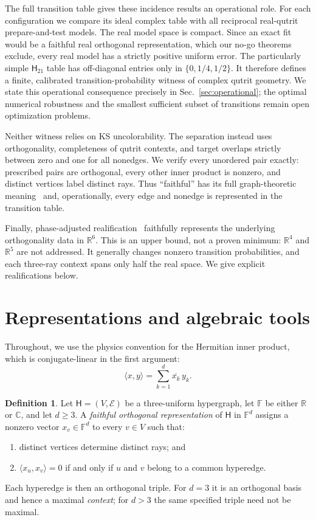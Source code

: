 \documentclass[twocolumn,aps,pra,floatfix,amsmath,amssymb,longbibliography]{revtex4-2}
\theoremstyle{definition}
\newtheorem{definition}[theorem]{Definition}
\theoremstyle{remark}
\newcommand{\C}{\mathbb C}
\newcommand{\R}{\mathbb R}
\newcommand{\Htwentyone}{\mathsf H_{21}}
\begin{document}
The full transition table gives these incidence results an operational role.
For each configuration we compare its ideal complex table with all reciprocal
real-qutrit prepare-and-test models.  The real model space is compact.  Since
an exact fit would be a faithful real orthogonal representation, which our
no-go theorems exclude, every real model has a strictly positive uniform
error.  The particularly simple $\Htwentyone$ table has off-diagonal entries
only in $\{0,1/4,1/2\}$.  It therefore defines a finite, calibrated
transition-probability witness of complex qutrit geometry.  We state this
operational consequence precisely in Sec.~\ref{sec:operational}; the optimal
numerical robustness and the smallest sufficient subset of transitions remain
open optimization problems.

Neither witness relies on KS uncolorability.  The separation instead uses
orthogonality, completeness of qutrit contexts, and target overlaps strictly
between zero and one for all nonedges.  We verify every unordered pair exactly:
prescribed pairs are orthogonal, every other inner product is nonzero, and distinct
vertices label distinct rays.  Thus ``faithful'' has its full graph-theoretic
meaning~\cite{lovasz-79,Portillo-2015} and, operationally, every edge and
nonedge is represented in the transition table.

Finally, phase-adjusted realification~\cite{svozil-2025-rvc} faithfully
represents the underlying orthogonality data in $\R^6$.  This is an upper
bound, not a proven minimum: $\R^4$ and $\R^5$ are not addressed.  It generally
changes nonzero transition probabilities, and each three-ray context spans
only half the real space.  We give explicit realifications below.

\section{Representations and algebraic tools}

Throughout, we use the physics convention for the Hermitian inner product,
which is conjugate-linear in the first argument:
\begin{equation}
 \langle x,y\rangle=\sum_{k=1}^{d}\overline{x_k}\,y_k.
 \label{eq:inner-product}
\end{equation}

\begin{definition}
Let $\mathsf H=(V,\mathcal E)$ be a three-uniform hypergraph, let
$\mathbb F$ be either $\R$ or $\C$, and let $d\ge3$.  A \emph{faithful
orthogonal representation} of $\mathsf H$ in $\mathbb F^d$ assigns a nonzero
vector $x_v\in\mathbb F^d$ to every $v\in V$ such that:
\begin{enumerate}
\item distinct vertices determine distinct rays; and
\item $\langle x_u,x_v\rangle=0$ if and only if $u$ and $v$ belong to a
common hyperedge.
\end{enumerate}
Each hyperedge is then an orthogonal triple.  For $d=3$ it is an orthogonal
basis and hence a maximal \emph{context}; for $d>3$ the same specified triple
need not be maximal.
\end{definition}
\end{document}
